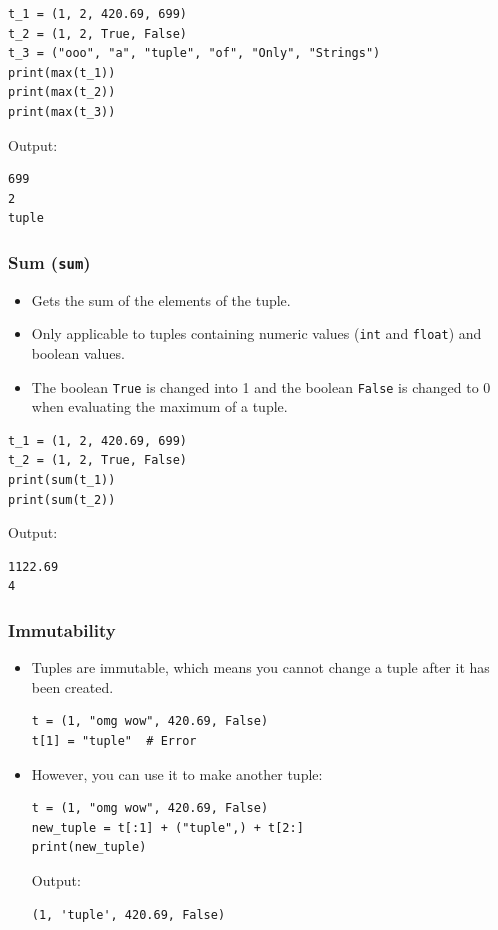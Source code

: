 \documentclass[11pt]{article}
\begin{document}
\begin{verbatim}
t_1 = (1, 2, 420.69, 699)
t_2 = (1, 2, True, False)
t_3 = ("ooo", "a", "tuple", "of", "Only", "Strings")
print(max(t_1))
print(max(t_2))
print(max(t_3))
\end{verbatim}

 \noindent Output:

\begin{verbatim}
699
2
tuple
\end{verbatim}

\subsubsection{Sum (\texttt{sum})}
\label{sec:orgf0919cd}
\begin{itemize}
\item Gets the sum of the elements of the tuple.
\item Only applicable to tuples containing numeric values (\texttt{int} and \texttt{float}) and boolean values.
\item The boolean \texttt{True} is changed into 1 and the boolean \texttt{False} is changed to 0 when evaluating the maximum of a tuple.
\end{itemize}

\begin{verbatim}
t_1 = (1, 2, 420.69, 699)
t_2 = (1, 2, True, False)
print(sum(t_1))
print(sum(t_2))
\end{verbatim}

 \noindent Output:

\begin{verbatim}
1122.69
4
\end{verbatim}

\subsubsection{Immutability}
\label{sec:org6ecda22}
\begin{itemize}
\item Tuples are immutable, which means you cannot change a tuple after it has been created.
\begin{verbatim}
t = (1, "omg wow", 420.69, False)
t[1] = "tuple"  # Error
\end{verbatim}

\item However, you can use it to make another tuple:
\begin{verbatim}
t = (1, "omg wow", 420.69, False)
new_tuple = t[:1] + ("tuple",) + t[2:]
print(new_tuple)
\end{verbatim}

 \noindent Output:

\begin{verbatim}
(1, 'tuple', 420.69, False)
\end{verbatim}
\end{itemize}
\end{document}
